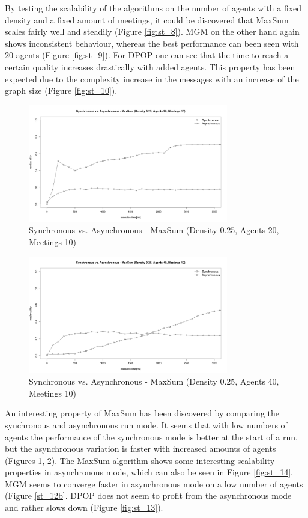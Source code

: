 By testing the scalability of the algorithms on the number of agents with a fixed density and a fixed amount of meetings, it could be discovered that MaxSum scales fairly well and steadily (Figure \ref{fig:st_8}). MGM on the other hand again shows inconsistent behaviour, whereas the best performance can been seen with 20 agents (Figure \ref{fig:st_9}). For DPOP one can see that the time  to reach a certain quality increases drastically with added agents. This property has been expected due to the complexity increase in the messages with an increase of the graph size (Figure \ref{fig:st_10}).
\begin{figure}[H]
\centering
\includegraphics[width=330px]{graphics/experiments/static/st_11}
\caption{Synchronous vs. Asynchronous - MaxSum (Density 0.25, Agents 20, Meetings 10)}
\label{fig:st_11}
\end{figure}
\begin{figure}[H]
\centering
\includegraphics[width=330px]{graphics/experiments/static/st_12}
\caption{Synchronous vs. Asynchronous - MaxSum (Density 0.25, Agents 40, Meetings 10)}
\label{fig:st_12}
\end{figure}

An interesting property of MaxSum has been discovered by comparing the synchronous and asynchronous run mode. It seems that with low numbers of agents the performance of the synchronous mode is better at the start of a run, but the asynchronous variation is faster with increased amounts of agents (Figures \ref{fig:st_11}, \ref{fig:st_12}). The MaxSum algorithm shows some interesting scalability properties in asynchronous mode, which can also be seen in Figure \ref{fig:st_14}. MGM seems to converge faster in asynchronous mode on a low number of agents (Figure \ref{st_12b}. DPOP does not seem to profit from the asynchronous mode and rather slows down (Figure \ref{fig:st_13}).

